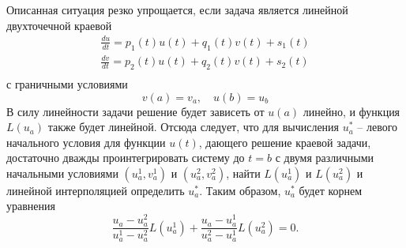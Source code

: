 Описанная ситуация резко упрощается, если задача является линейной двухточечной краевой
\begin{gather*}
    \frac{du}{dt} = p_1(t)u(t) + q_1(t)v(t) + s_1(t)\\
    \frac{dv}{dt} = p_2(t)u(t) + q_2(t)v(t) + s_2(t)\\
\end{gather*}
с граничными условиями
\begin{equation*}
    v(a) = v_a, \quad u(b) = u_b
\end{equation*}
В силу линейности задачи решение будет зависеть от $u(a)$ линейно, и функция $\displaystyle L(u_a)$ также будет
линейной. Отсюда следует, что для вычисления $\displaystyle u_a^*$ -- левого начального условия для функции $u(t)$,
дающего решение краевой задачи, достаточно дважды проинтегрировать систему до $t = b$ с двумя различными начальными
условиями $\displaystyle (u_a^1, v_a^1)$ и $\displaystyle (u_a^2, v_a^2)$, найти $\displaystyle L\left( u_a^1 \right)$
и $\displaystyle L \left( u_a^2 \right)$ и линейной интерполяцией определить $\displaystyle u_a^*$. Таким образом,
$\displaystyle u_a^*$ будет корнем уравнения
\begin{equation*}
    \frac{u_a - u_a^2}{u_a^1 - u_a^2}L\left( u_a^1 \right) + \frac{u_a - u_a^1}{u_a^2 - u_a^1}L\left( u_a^2 \right) = 0.
\end{equation*}
